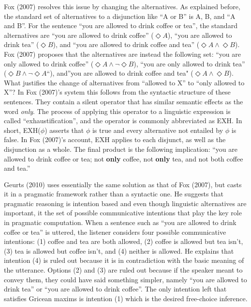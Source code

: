 \documentclass[oneside]{report}
\theoremstyle{definition}
\theoremstyle{definition}
\theoremstyle{definition}
\theoremstyle{remark}
\begin{document}
Fox (2007) resolves this issue by changing the alternatives. As
explained before, the standard set of alternatives to a disjunction like
``A or B'' is A, B, and ``A and B''. For the sentence ``you are allowed
to drink coffee or tea'', the standard alternatives are ``you are
allowed to drink coffee'' (\(\Diamond A\)), ``you are allowed to drink
tea'' (\(\Diamond B\)), and ``you are allowed to drink coffee and tea''
(\(\Diamond A \land \Diamond B\)). Fox (2007) proposes that the
alternatives are instead the following set: ``you are only allowed to
drink coffee'' (\(\Diamond A \land \lnot \Diamond B\)), ``you are only
allowed to drink tea'' (\(\Diamond B \land \lnot \Diamond A\)``),
and''you are allowed to drink coffee and tea"
(\(\Diamond A \land \Diamond B\)). What justifies the change of
alternatives from ``allowed to X'' to ``only allowed to X''? In Fox
(2007)'s system this follows from the syntactic structure of these
sentences. They contain a silent operator that has similar semantic
effects as the word \emph{only}. The process of applying this operator
to a linguistic expression is called ``exhaustification'', and the
operator is commonly abbreviated as EXH. In short, EXH(\(\phi\)) asserts
that \(\phi\) is true and every alternative not entailed by \(\phi\) is
false. In Fox (2007)'s account, EXH applies to each disjunct, as well as
the disjunction as a whole. The final product is the following
implication: ``you are allowed to drink coffee or tea; not \textbf{only}
coffee, not \textbf{only} tea, and not both coffee and tea.''

Geurts (2010) uses essentially the same solution as that of Fox (2007),
but casts it in a pragmatic framework rather than a syntactic one. He
suggests that pragmatic reasoning is intention based and even though
linguistic alternatives are important, it the set of possible
communicative intentions that play the key role in pragmatic
computation. When a sentence such as ``you are allowed to drink coffee
or tea'' is uttered, the listener considers four possible communicative
intentions: (1) coffee and tea are both allowed, (2) coffee is allowed
but tea isn't,(3) tea is allowed but coffee isn't, and (4) neither is
allowed. He explains that intention (4) is ruled out because it is in
contradiction with the basic meaning of the utterance. Options (2) and
(3) are ruled out because if the speaker meant to convey them, they
could have said something simpler, namely ``you are allowed to drink
tea'' or ``you are allowed to drink coffee''. The only intention left
that satisfies Gricean maxims is intention (1) which is the desired
free-choice inference.
\end{document}
